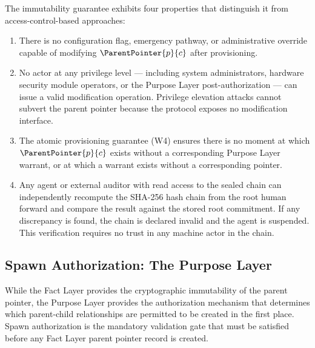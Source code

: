 The immutability guarantee exhibits four properties that distinguish it from access-control-based approaches:

\begin{enumerate}
    \item[(E1) \textbf{No override path.}] There is no configuration flag, emergency pathway, or administrative override capable of modifying $\ParentPointer{p}{c}$ after provisioning.
    \item[(E2) \textbf{No privilege elevation.}] No actor at any privilege level --- including system administrators, hardware security module operators, or the Purpose Layer post-authorization --- can issue a valid modification operation. Privilege elevation attacks cannot subvert the parent pointer because the protocol exposes no modification interface.
    \item[(E3) \textbf{No temporal window.}] The atomic provisioning guarantee (W4) ensures there is no moment at which $\ParentPointer{p}{c}$ exists without a corresponding Purpose Layer warrant, or at which a warrant exists without a corresponding pointer.
    \item[(E4) \textbf{Agent-self-verifying.}] Any agent or external auditor with read access to the sealed chain can independently recompute the SHA-256 hash chain from the root human forward and compare the result against the stored root commitment. If any discrepancy is found, the chain is declared invalid and the agent is suspended. This verification requires no trust in any machine actor in the chain.
\end{enumerate}

\subsection{Spawn Authorization: The Purpose Layer}
\label{sec:purpose_layer_spawn_auth}

While the Fact Layer provides the cryptographic immutability of the parent pointer, the Purpose Layer provides the authorization mechanism that determines which parent-child relationships are permitted to be created in the first place. Spawn authorization is the mandatory validation gate that must be satisfied before any Fact Layer parent pointer record is created.

